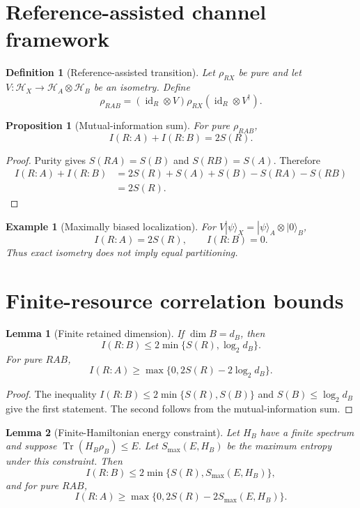 \documentclass[11pt]{article}
\newtheorem{proposition}{Proposition}
\newtheorem{lemma}{Lemma}
\newtheorem{definition}{Definition}
\newtheorem{example}{Example}
\newcommand{\cH}{\mathcal H}
\newcommand{\id}{\operatorname{id}}
\newcommand{\Tr}{\operatorname{Tr}}
\begin{document}
\section{Reference-assisted channel framework}
\label{sec:channel}

\begin{definition}[Reference-assisted transition]
Let $\rho_{RX}$ be pure and let $V:\cH_X\rightarrow\cH_A\otimes\cH_B$ be an isometry. Define
\[
\rho_{RAB}=(\id_R\otimes V)\rho_{RX}(\id_R\otimes V^\dagger).
\]
\end{definition}

\begin{proposition}[Mutual-information sum]
For pure $\rho_{RAB}$,
\[
I(R:A)+I(R:B)=2S(R).
\]
\end{proposition}

\begin{proof}
Purity gives $S(RA)=S(B)$ and $S(RB)=S(A)$. Therefore
\begin{align*}
I(R:A)+I(R:B)
&=2S(R)+S(A)+S(B)-S(RA)-S(RB)\\
&=2S(R).
\end{align*}
\end{proof}

\begin{example}[Maximally biased localization]
For $V|\psi\rangle_X=|\psi\rangle_A\otimes|0\rangle_B$,
\[
I(R:A)=2S(R),\qquad I(R:B)=0.
\]
Thus exact isometry does not imply equal partitioning.
\end{example}

\section{Finite-resource correlation bounds}
\label{sec:resources}

\begin{lemma}[Finite retained dimension]
If $\dim B=d_B$, then
\[
I(R:B)\leq2\min\{S(R),\log_2d_B\}.
\]
For pure $RAB$,
\[
I(R:A)\geq\max\{0,2S(R)-2\log_2d_B\}.
\]
\end{lemma}

\begin{proof}
The inequality $I(R:B)\leq2\min\{S(R),S(B)\}$ and $S(B)\leq\log_2d_B$ give the first statement. The second follows from the mutual-information sum.
\end{proof}

\begin{lemma}[Finite-Hamiltonian energy constraint]
Let $H_B$ have a finite spectrum and suppose $\Tr(H_B\rho_B)\leq E$. Let $S_{\max}(E,H_B)$ be the maximum entropy under this constraint. Then
\[
I(R:B)\leq2\min\{S(R),S_{\max}(E,H_B)\},
\]
and for pure $RAB$,
\[
I(R:A)\geq\max\{0,2S(R)-2S_{\max}(E,H_B)\}.
\]
\end{lemma}
\end{document}
